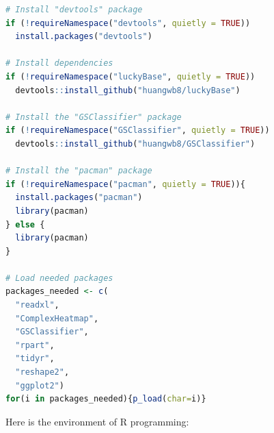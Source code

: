 \documentclass[
  12pt,
]{book}
\begin{document}
\begin{lstlisting}[language=R]
# Install "devtools" package
if (!requireNamespace("devtools", quietly = TRUE))
  install.packages("devtools")

# Install dependencies
if (!requireNamespace("luckyBase", quietly = TRUE))
  devtools::install_github("huangwb8/luckyBase")

# Install the "GSClassifier" package
if (!requireNamespace("GSClassifier", quietly = TRUE))
  devtools::install_github("huangwb8/GSClassifier")

# Install the "pacman" package
if (!requireNamespace("pacman", quietly = TRUE)){
  install.packages("pacman")
  library(pacman)
} else {
  library(pacman)
}

# Load needed packages
packages_needed <- c(
  "readxl",
  "ComplexHeatmap",
  "GSClassifier",
  "rpart",
  "tidyr",
  "reshape2",
  "ggplot2")
for(i in packages_needed){p_load(char=i)}
\end{lstlisting}

Here is the environment of R programming:
\end{document}
